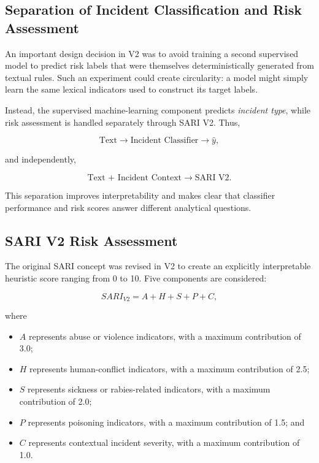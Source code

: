\documentclass[conference]{IEEEtran}
\begin{document}
\subsection{Separation of Incident Classification and Risk Assessment}

An important design decision in V2 was to avoid training a second supervised
model to predict risk labels that were themselves deterministically generated
from textual rules. Such an experiment could create circularity: a model
might simply learn the same lexical indicators used to construct its target
labels.

Instead, the supervised machine-learning component predicts
\textit{incident type}, while risk assessment is handled separately through
SARI V2. Thus,

\begin{equation}
\text{Text}
\rightarrow
\text{Incident Classifier}
\rightarrow
\widehat{y},
\end{equation}

and independently,

\begin{equation}
\text{Text + Incident Context}
\rightarrow
\text{SARI V2}.
\end{equation}

This separation improves interpretability and makes clear that classifier
performance and risk scores answer different analytical questions.

\subsection{SARI V2 Risk Assessment}

The original SARI concept was revised in V2 to create an explicitly
interpretable heuristic score ranging from 0 to 10. Five components are
considered:

\begin{equation}
SARI_{V2}
=
A + H + S + P + C,
\end{equation}

where

\begin{itemize}
    \item $A$ represents abuse or violence indicators, with a maximum
    contribution of 3.0;
    \item $H$ represents human-conflict indicators, with a maximum
    contribution of 2.5;
    \item $S$ represents sickness or rabies-related indicators, with a
    maximum contribution of 2.0;
    \item $P$ represents poisoning indicators, with a maximum contribution
    of 1.5; and
    \item $C$ represents contextual incident severity, with a maximum
    contribution of 1.0.
\end{itemize}
\end{document}

